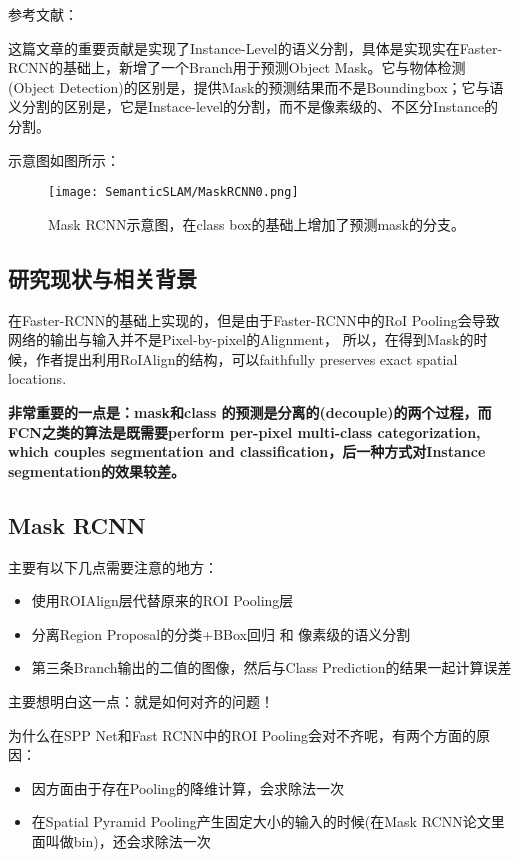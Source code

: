 参考文献：\cite{maskrcnn2017he}

这篇文章的重要贡献是实现了Instance-Level的语义分割，具体是实现实在Faster-RCNN的基础上，新增了一个Branch用于预测Object Mask。它与物体检测(Object Detection)的区别是，提供Mask的预测结果而不是Boundingbox；它与语义分割的区别是，它是Instace-level的分割，而不是像素级的、不区分Instance的分割。

示意图如图所示：
\begin{figure}[!hbtp]
\centering
\texttt{[image: SemanticSLAM/MaskRCNN0.png]}
\caption{Mask RCNN示意图，在class box的基础上增加了预测mask的分支。}
\label{MaskRCNN0}
\end{figure}

\subsection{研究现状与相关背景}

在Faster-RCNN的基础上实现的，但是由于Faster-RCNN中的RoI Pooling会导致网络的输出与输入并不是Pixel-by-pixel的Alignment， 所以，在得到Mask的时候，作者提出利用RoIAlign的结构，可以faithfully preserves exact spatial locations.

{\bfseries 非常重要的一点是：mask和class 的预测是分离的(decouple)的两个过程，而FCN之类的算法是既需要perform per-pixel multi-class categorization, which couples segmentation and classification，后一种方式对Instance segmentation的效果较差。}


\subsection{Mask RCNN}

主要有以下几点需要注意的地方：
\begin{itemize}
\item 使用ROIAlign层代替原来的ROI Pooling层
\item 分离Region Proposal的分类+BBox回归 和 像素级的语义分割
\item 第三条Branch输出的二值的图像，然后与Class Prediction的结果一起计算误差
\end{itemize}

主要想明白这一点：就是如何对齐的问题！

为什么在SPP Net和Fast RCNN中的ROI Pooling会对不齐呢，有两个方面的原因：
\begin{itemize}
\item 因方面由于存在Pooling的降维计算，会求除法一次
\item 在Spatial Pyramid Pooling产生固定大小的输入的时候(在Mask RCNN论文里面叫做bin)，还会求除法一次
\end{itemize}

